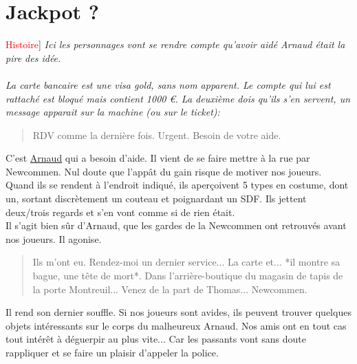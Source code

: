 \documentclass[10pt,a4paper,twocolumn]{article}
\newenvironment{lAbstract}[1]{{[}\textcolor{red}{#1}{]}\itshape}{\\ \\}
\begin{document}
\section{Jackpot ?}
\begin{lAbstract}{Histoire}
Ici les personnages vont se rendre compte qu'avoir aidé Arnaud était la pire des idée.
\end{lAbstract}
La carte bancaire est une visa gold, sans nom apparent. Le compte qui lui est rattaché est bloqué mais contient 1000 €. La deuxième dois qu'ils s'en servent, un message apparait sur la machine (ou sur le ticket): 
\begin{quote}
RDV comme la dernière fois. Urgent. Besoin de votre aide.
\end{quote}
C'est \hyperlink{arnaud}{Arnaud} qui a besoin d'aide. Il vient de se faire mettre à la rue par Newcommen. Nul doute que l'appât du gain risque de motiver nos joueurs. \\
Quand ils se rendent à l'endroit indiqué, ils aperçoivent 5 types en costume, dont un, sortant discrètement un couteau et poignardant un SDF. Ils jettent deux/trois regards et s'en vont comme si de rien était.
\\
Il s'agit bien sûr d'Arnaud, que les gardes de la Newcommen ont retrouvés avant nos joueurs. Il agonise.
\begin{quote}
Ils m'ont eu. Rendez-moi un dernier service... La carte et... *il montre sa bague, une tête de mort*. Dans l'arrière-boutique du magasin de tapis de la porte Montreuil... Venez de la part de Thomas... Newcommen.
\end{quote}
Il rend son dernier souffle.
Si nos joueurs sont avides, ils peuvent trouver quelques objets intéressants sur le corps du malheureux Arnaud.
Nos amis ont en tout cas tout intérêt à déguerpir au plus vite... Car les passants vont sans doute rappliquer et se faire un plaisir d'appeler la police.
\end{document}
